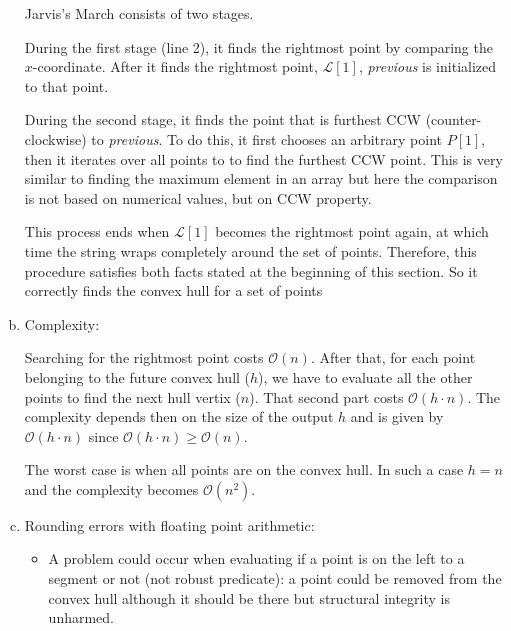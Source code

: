 \documentclass[11pt]{article}
\begin{document}
\begin{enumerate}[a.]
    Jarvis's March consists of two stages.
    
    During the first stage (line 2), it finds the rightmost point by comparing the $x$-coordinate.  After it finds the rightmost point, $\mathcal{L}[1]$, \emph{previous} is initialized to that point.
    
    During the second stage, it finds the point that is furthest CCW (counter-clockwise) to \emph{previous}. To do this, it first chooses an arbitrary point $P[1]$, then it iterates over all points to to find the furthest CCW point.  This is very similar to finding the maximum element in an array but here the comparison is not based on numerical values, but on CCW property.

    This process ends when $\mathcal{L}[1]$ becomes the rightmost point again,  at which time the string wraps completely around the set of points. Therefore, this procedure satisfies both facts stated at the beginning of this section. So it correctly finds the convex hull for a set of points

    
    \item Complexity: 
    
    Searching for the rightmost point costs $\mathcal{O}(n)$. After that, for each point belonging to the future convex hull ($h$), we have to evaluate all the other points to find the next hull vertix ($n$). That second part costs $\mathcal{O}(h\cdot n)$. The complexity depends then on the size of the output $h$ and is given by $\mathcal{O}(h\cdot n)$ since $\mathcal{O}(h\cdot n)\geq \mathcal{O}(n)$. 
    
    The worst case is when all points are on the convex hull. In such a case $h=n$ and the complexity becomes $\mathcal{O}(n^2)$.
    
    \item Rounding errors with floating point arithmetic:
    \begin{itemize}
        \item A problem could occur when evaluating if a point is on the left to a segment or not (not robust predicate): a point could be removed from the convex hull although it should be there but structural integrity is unharmed.
    \end{itemize}
\end{enumerate}

\FloatBarrier
\newpage
\end{document}
